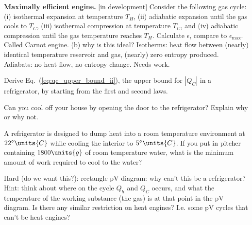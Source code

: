 \begin{problem} {\bf Maximally efficient engine.} [in development]
  Consider the following gas cycle: (i) isothermal expansion at
  temperature $T_H$, (ii) adiabatic expansion until the gas cools to
  $T_C$, (iii) isothermal compression at temperature $T_C$, and (iv)
  adiabatic compression until the gas temperature reaches $T_H$.
  Calculate $\epsilon$, compare to $\epsilon_\text{max}$.  Called
  Carnot engine.  (b) why is this ideal?  Isotherms: heat flow between
  (nearly) identical temperature reservoir and gas, (nearly) zero
  entropy produced.  Adiabats: no heat flow, no entropy change.  Needs
  work.
\end{problem}

\begin{problem} 
  Derive Eq.~(\ref{eq:qc_upper_bound_ii}), the upper bound for $|Q_C|$
  in a refrigerator, by starting from the first and second laws.
\end{problem}

\begin{problem}
  Can you cool off your house by opening the door to the refrigerator?
  Explain why or why not.
\end{problem}

\begin{problem} 
  A refrigerator is designed to dump heat into a room temperature
  environment at $22^\circ\units{C}$ while cooling the interior to
  $5^\circ\units{C}$.   If you put in pitcher containing
  $1800\units{g}$ of room temperature water, what is the minimum amount
  of work required to cool to the water?
\end{problem}

\begin{problem} 
  Hard (do we want this?): rectangle pV diagram: why can't this be a
  refrigerator?  Hint: think about where on the cycle $Q_h$ and $Q_C$
  occurs, and what the temperature of the working substance (the gas)
  is at that point in the pV diagram.  Is there any similar
  restriction on heat engines?  I.e. some pV cycles that can't be heat
  engines?
\end{problem}
